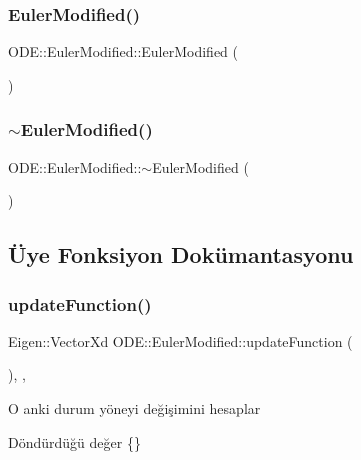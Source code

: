 \subsubsection{\texorpdfstring{EulerModified()}{EulerModified()}}
{\footnotesize\ttfamily O\+D\+E\+::\+Euler\+Modified\+::\+Euler\+Modified (\begin{DoxyParamCaption}{ }\end{DoxyParamCaption})}

\mbox{\label{classODE_1_1EulerModified_ae84b8cc0351af53819e0933adb7ffd1d}} 
\subsubsection{\texorpdfstring{$\sim$EulerModified()}{~EulerModified()}}
{\footnotesize\ttfamily O\+D\+E\+::\+Euler\+Modified\+::$\sim$\+Euler\+Modified (\begin{DoxyParamCaption}{ }\end{DoxyParamCaption})\hspace{0.3cm}{\ttfamily [virtual]}}



\subsection{Üye Fonksiyon Dokümantasyonu}
\mbox{\label{classODE_1_1EulerModified_af318a33aabefccbf08f079d1d1600112}} 
\subsubsection{\texorpdfstring{updateFunction()}{updateFunction()}}
{\footnotesize\ttfamily Eigen\+::\+Vector\+Xd O\+D\+E\+::\+Euler\+Modified\+::update\+Function (\begin{DoxyParamCaption}{ }\end{DoxyParamCaption})\hspace{0.3cm}{\ttfamily [override]}, {\ttfamily [protected]}, {\ttfamily [virtual]}}

O anki durum yöneyi değişimini hesaplar \begin{DoxyReturn}{Döndürdüğü değer}
\{\} 
\end{DoxyReturn}


